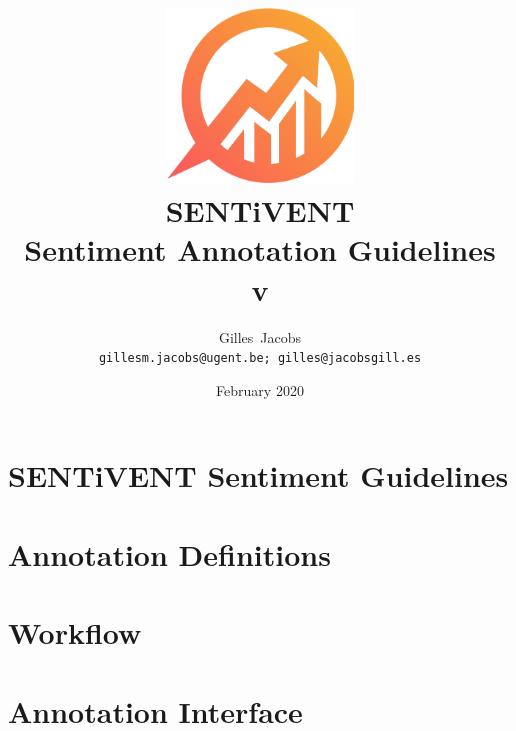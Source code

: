 \documentclass[a4paper]{report}
\title{
    \includegraphics[width=5cm]{img/sentiventlogo-gradient.png}\\
    [10pt]{\huge\bfseries {\Huge S{\huge ENT}i{\huge VENT}}\\
    Sentiment Annotation Guidelines\\
    v\vhCurrentVersion\\
    \Large{\normalfont{Technical Report}}
    }
}
\author{Gilles~Jacobs \\ \small{\texttt{gillesm.jacobs@ugent.be; gilles@jacobsgill.es}}}
\date{February 2020}
\begin{document}

\chapter{SENTiVENT Sentiment Guidelines} %
\label{chapter/intro}


\chapter{Annotation Definitions}
\label{chapter/definitions}


\chapter{Workflow}
\label{chapter/workflow}


\chapter{Annotation Interface}
\label{chapter/interface}



\end{document}
